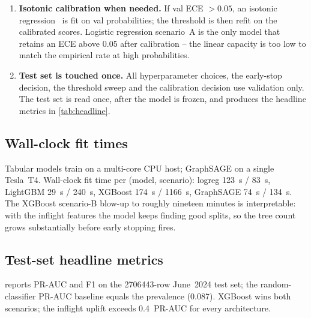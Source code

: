 \begin{enumerate}[leftmargin=*]
    \item \textbf{Isotonic calibration when needed.} If val ECE $> \num{0.05}$, an isotonic regression~\cite{zadrozny2001calibration} is fit on val probabilities; the threshold is then refit on the calibrated scores. Logistic regression scenario~A is the only model that retains an ECE above \num{0.05} after calibration -- the linear capacity is too low to match the empirical rate at high probabilities.
    \item \textbf{Test set is touched once.} All hyperparameter choices, the early-stop decision, the threshold sweep and the calibration decision use validation only. The test set is read once, after the model is frozen, and produces the headline metrics in \cref{tab:headline}.
\end{enumerate}

\subsection{Wall-clock fit times}

Tabular models train on a multi-core CPU host; GraphSAGE on a single Tesla~T4. Wall-clock fit time per (model, scenario): logreg \SI{123}{s} / \SI{83}{s}, LightGBM \SI{29}{s} / \SI{240}{s}, XGBoost \SI{174}{s} / \SI{1166}{s}, GraphSAGE \SI{74}{s} / \SI{134}{s}. The XGBoost scenario-B blow-up to roughly nineteen minutes is interpretable: with the inflight features the model keeps finding good splits, so the tree count grows substantially before early stopping fires.

\subsection{Test-set headline metrics}

 reports PR-AUC and F1 on the \num{2706443}-row June~2024 test set; the random-classifier PR-AUC baseline equals the prevalence (\num{0.087}). XGBoost wins both scenarios; the inflight uplift exceeds \num{0.4}~PR-AUC for every architecture.

